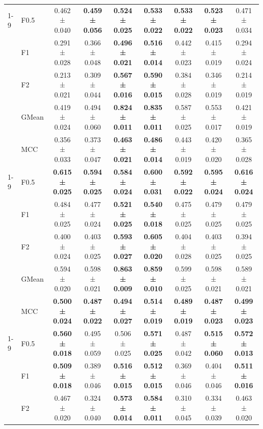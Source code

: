 \begin{table}[H]
{\begin{tabular}{llccccccc}
\cline{1-9}
\multirow[t]{5}{*}{RandomForest} & F0.5 & 0.462 ± 0.040 & \textbf{0.459 ± 0.056} & \textbf{0.524 ± 0.025} & \textbf{0.533 ± 0.022} & \textbf{0.533 ± 0.022} & \textbf{0.523 ± 0.023} & 0.471 ± 0.034 \\
 & F1 & 0.291 ± 0.028 & 0.366 ± 0.048 & \textbf{0.496 ± 0.021} & \textbf{0.516 ± 0.014} & 0.442 ± 0.023 & 0.415 ± 0.019 & 0.294 ± 0.024 \\
 & F2 & 0.213 ± 0.021 & 0.309 ± 0.044 & \textbf{0.567 ± 0.016} & \textbf{0.590 ± 0.015} & 0.384 ± 0.028 & 0.346 ± 0.019 & 0.214 ± 0.019 \\
 & GMean & 0.419 ± 0.024 & 0.494 ± 0.060 & \textbf{0.824 ± 0.011} & \textbf{0.835 ± 0.011} & 0.587 ± 0.025 & 0.553 ± 0.017 & 0.421 ± 0.019 \\
 & MCC & 0.356 ± 0.033 & 0.373 ± 0.047 & \textbf{0.463 ± 0.021} & \textbf{0.486 ± 0.014} & 0.443 ± 0.019 & 0.420 ± 0.020 & 0.365 ± 0.028 \\
\cline{1-9}
\multirow[t]{5}{*}{TabICL} & F0.5 & \textbf{0.615 ± 0.025} & \textbf{0.594 ± 0.025} & \textbf{0.584 ± 0.024} & \textbf{0.600 ± 0.031} & \textbf{0.592 ± 0.022} & \textbf{0.595 ± 0.024} & \textbf{0.616 ± 0.024} \\
 & F1 & 0.484 ± 0.025 & 0.477 ± 0.024 & \textbf{0.521 ± 0.025} & \textbf{0.540 ± 0.018} & 0.475 ± 0.025 & 0.479 ± 0.025 & 0.479 ± 0.025 \\
 & F2 & 0.400 ± 0.024 & 0.403 ± 0.025 & \textbf{0.593 ± 0.027} & \textbf{0.605 ± 0.020} & 0.404 ± 0.028 & 0.403 ± 0.025 & 0.394 ± 0.025 \\
 & GMean & 0.594 ± 0.020 & 0.598 ± 0.021 & \textbf{0.863 ± 0.009} & \textbf{0.859 ± 0.010} & 0.599 ± 0.025 & 0.598 ± 0.021 & 0.589 ± 0.021 \\
 & MCC & \textbf{0.500 ± 0.024} & \textbf{0.487 ± 0.022} & \textbf{0.494 ± 0.027} & \textbf{0.514 ± 0.019} & \textbf{0.489 ± 0.019} & \textbf{0.487 ± 0.023} & \textbf{0.499 ± 0.023} \\
\cline{1-9}
\multirow[t]{5}{*}{TabM} & F0.5 & \textbf{0.560 ± 0.018} & 0.495 ± 0.059 & 0.506 ± 0.025 & \textbf{0.571 ± 0.025} & 0.487 ± 0.042 & \textbf{0.515 ± 0.060} & \textbf{0.572 ± 0.013} \\
 & F1 & \textbf{0.509 ± 0.018} & 0.389 ± 0.046 & \textbf{0.516 ± 0.015} & \textbf{0.512 ± 0.015} & 0.369 ± 0.046 & 0.404 ± 0.046 & \textbf{0.511 ± 0.016} \\
 & F2 & 0.467 ± 0.020 & 0.324 ± 0.040 & \textbf{0.573 ± 0.014} & \textbf{0.584 ± 0.011} & 0.310 ± 0.045 & 0.334 ± 0.039 & 0.463 ± 0.020 \\

\end{tabular}}
\end{table}
